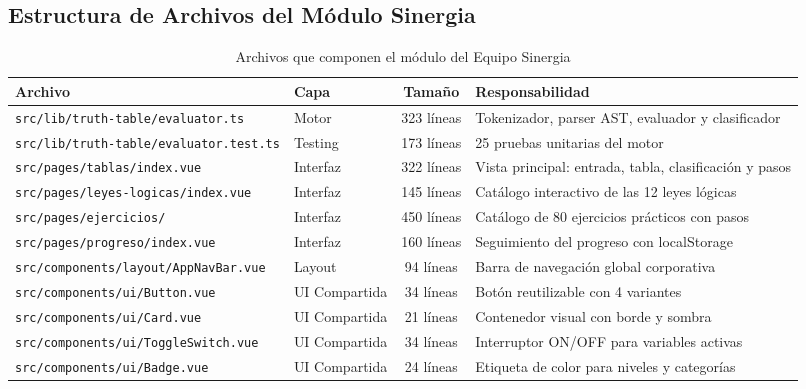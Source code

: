 \documentclass[11pt,a4paper]{article}
\begin{document}
\subsection{Estructura de Archivos del Módulo Sinergia}
\begin{table}[H]
\centering
\caption{Archivos que componen el módulo del Equipo Sinergia}
\label{tab:archivos}
\small
\begin{tabularx}{\textwidth}{llcX}
\toprule
\textbf{Archivo} & \textbf{Capa} & \textbf{Tamaño} & \textbf{Responsabilidad} \\
\midrule
\texttt{src/lib/truth-table/evaluator.ts} & Motor & 323 líneas & Tokenizador, parser AST, evaluador y clasificador \\
\texttt{src/lib/truth-table/evaluator.test.ts} & Testing & 173 líneas & 25 pruebas unitarias del motor \\
\texttt{src/pages/tablas/index.vue} & Interfaz & 322 líneas & Vista principal: entrada, tabla, clasificación y pasos \\
\texttt{src/pages/leyes-logicas/index.vue} & Interfaz & 145 líneas & Catálogo interactivo de las 12 leyes lógicas \\
\texttt{src/pages/ejercicios/} & Interfaz & 450 líneas & Catálogo de 80 ejercicios prácticos con pasos \\
\texttt{src/pages/progreso/index.vue} & Interfaz & 160 líneas & Seguimiento del progreso con localStorage \\
\texttt{src/components/layout/AppNavBar.vue} & Layout & 94 líneas & Barra de navegación global corporativa \\
\texttt{src/components/ui/Button.vue} & UI Compartida & 34 líneas & Botón reutilizable con 4 variantes \\
\texttt{src/components/ui/Card.vue} & UI Compartida & 21 líneas & Contenedor visual con borde y sombra \\
\texttt{src/components/ui/ToggleSwitch.vue} & UI Compartida & 34 líneas & Interruptor ON/OFF para variables activas \\
\texttt{src/components/ui/Badge.vue} & UI Compartida & 24 líneas & Etiqueta de color para niveles y categorías \\
\bottomrule
\end{tabularx}
\end{table}

\end{document}
